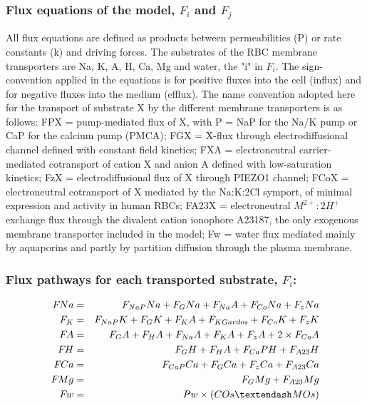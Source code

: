 \documentclass[a4paper]{article}
\newcommand{\med}[1]{M#1}
\newcommand{\cell}[1]{C#1}
\newcommand{\MOs}{\med{Os}}
\newcommand{\COs}{\cell{Os}}
\newcommand{\F}[2]{F_{#1}#2}
\begin{document}
\subsubsection{Flux equations of the model, $F_i$ and $F_j$}
All flux equations are defined as products between permeabilities (P) or rate constants (k) and driving forces. The substrates of the RBC membrane transporters are Na, K, A, H, Ca, Mg and water, the "i" in $F_i$.  The sign-convention applied in the equations is for positive fluxes into the cell (influx) and for negative fluxes into the medium (efflux). The name convention adopted here for the transport of substrate X by the different membrane transporters is as follows: FPX = pump-mediated flux of X, with P = NaP for the Na/K pump or CaP for the calcium pump (PMCA); FGX = X-flux through electrodiffusional channel defined with constant field kinetics; FXA = electroneutral carrier-mediated cotransport of cation X and anion A defined with low-saturation kinetics; FzX = electrodiffusional flux of X through PIEZO1 channel; FCoX = electroneutral cotransport of X mediated by the Na:K:2Cl symport, of minimal expression and activity in human RBCs; FA23X = electroneutral $M^{2+}:2H^+$ exchange flux through the divalent cation ionophore A23187, the only exogenous membrane transporter included in the model; Fw = water flux mediated mainly by aquaporins and partly by partition diffusion through the plasma membrane.  

\setcounter{equation}{0}
\renewcommand{\theequation}{10.\alph{equation}}

\subsubsection{Flux pathways for each transported substrate, $F_i$:}
\begin{eqnarray}
\F{}{Na} &=& \F{NaP}{Na} + \F{G}{Na} + \F{Na}{A} + \F{Co}{Na} + \F{z}{Na}\\
\F{K} &=& \F{NaP}{K} + \F{G}{K} + \F{K}{A} + \F{KGardos} + \F{Co}{K} + \F{z}{K}\\
\F{}{A} &=& \F{G}{A} + \F{H}{A} + \F{Na}{A} + \F{K}{A} + \F{z}{A} + 2\times\F{Co}{A}\\
\F{}{H} &=& \F{G}{H} + \F{H}{A} + \F{Ca}{PH} + \F{A23}{H} \\
\F{}{Ca} &=& \F{CaP}{Ca} + \F{G}{Ca} + \F{z}{Ca} + \F{A23}{Ca} \\
\F{}{Mg} &=& \F{G}{Mg} + \F{A23}{Mg} \\
\F{}{w}  &=& Pw\times (\COs – \MOs)
\end{eqnarray}
\end{document}
